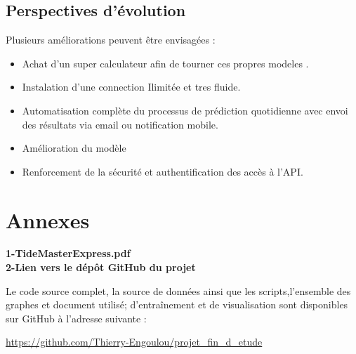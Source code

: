 \documentclass[a4paper,12pt,openany]{report}
\begin{document}
\section*{Perspectives d’évolution}
Plusieurs améliorations peuvent être envisagées :
\begin{itemize}
	\item Achat d'un super calculateur afin de tourner ces propres modeles .
	\item Instalation d'une connection Ilimitée  et tres fluide.
	\item Automatisation complète du processus de prédiction quotidienne avec envoi des résultats via email ou notification mobile.\\
	\item Amélioration du modèle 
	\item  Renforcement de la sécurité et authentification des accès à l’API.
\end{itemize}
		\label{ch:Conclusiongénérale et perspectives} %
		\newpage
	\label{RéférencesBibliographiques}












%	
 
    \clearpage
    \chapter*{Annexes}
    
    	\centering
 \textbf{1-TideMasterExpress.pdf}\\	
 \textbf{2-Lien vers le dépôt GitHub du projet}
  
  Le code source complet, la source  de données ainsi que les scripts,l'ensemble des graphes et document utilisé; d'entraînement et de visualisation sont disponibles sur GitHub à l'adresse suivante :
  
  \href{https://github.com/Thierry-Engoulou/projet_fin_d_etude}{https://github.com/Thierry-Engoulou/projet\_fin\_d\_etude}	
\end{document}
